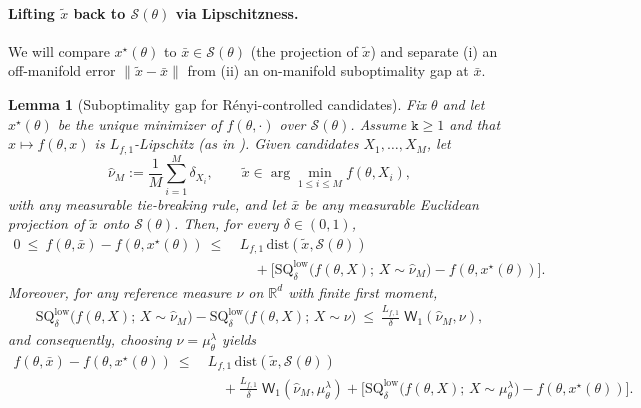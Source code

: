 \documentclass{article}
\theoremstyle{normaltheorem}
\newtheorem{lemma}[lemma]{Lemma}
\newcommand{\gibbs}{\mu}
\newcommand{\dimk}{\texttt{k}}
\newcommand{\R}{\mathbb{R}}
\newcommand{\calS}{\mathcal{S}}
\begin{document}
\paragraph{Lifting $\tilde x$ back to $\calS(\theta)$ via Lipschitzness.}
We will compare $x^\star(\theta)$ to $\bar x\in\calS(\theta)$ (the projection of $\tilde x$) and separate
(i) an off-manifold error $\|\tilde x-\bar x\|$ from (ii) an on-manifold suboptimality gap at $\bar x$.
\begin{lemma}[Suboptimality gap for R\'enyi-controlled candidates]\label{lem:inner-quality-gap}
Fix $\theta$ and let $x^\star(\theta)$ be the unique minimizer of $f(\theta,\cdot)$ over $\calS(\theta)$.
Assume \(\dimk\ge1\) and that $x\mapsto f(\theta,x)$ is $L_{f,1}$-Lipschitz (as in ).
Given candidates \(X_1,\ldots,X_M\), let
\[
\widehat\nu_M:=\frac1M\sum_{i=1}^M\delta_{X_i},
\qquad
\tilde x\in\arg\min_{1\le i\le M}f(\theta,X_i),
\]
with any measurable tie-breaking rule, and let $\bar x$ be any measurable Euclidean projection of \(\tilde x\) onto
\(\calS(\theta)\).
Then, for every \(\delta\in(0,1)\),
\begin{align}
0 \ \le\ f(\theta,\bar x)-f(\theta,x^\star(\theta))
\ \le\ & L_{f,1}\,\mathrm{dist}(\tilde x,\calS(\theta))
\nonumber\\
&\quad + \Big[\mathrm{SQ}^{\mathrm{low}}_\delta\big(f(\theta,X);\,X\sim\widehat\nu_M\big)
	        - f(\theta,x^\star(\theta))\Big].
\label{eq:value-gap-basic}
\end{align}
Moreover, for any reference measure $\nu$ on $\R^d$ with finite first moment,
\begin{align}
\mathrm{SQ}^{\mathrm{low}}_\delta\big(f(\theta,X);\,X\sim\widehat\nu_M\big)
- \mathrm{SQ}^{\mathrm{low}}_\delta\big(f(\theta,X);\,X\sim\nu\big)
\ \le\ \frac{L_{f,1}}{\delta}\;\mathsf{W}_1(\widehat\nu_M,\nu),
\label{eq:sq-w1-lip}
\end{align}
and consequently, choosing $\nu=\gibbs_\theta^\lambda$ yields
\begin{align}
f(\theta,\bar x)-f(\theta,x^\star(\theta))
\ \le\ & L_{f,1}\,\mathrm{dist}(\tilde x,\calS(\theta))
\nonumber\\
&\quad + \frac{L_{f,1}}{\delta}\;\mathsf{W}_1(\widehat\nu_M,\gibbs_\theta^\lambda)
+ \Big[\mathrm{SQ}^{\mathrm{low}}_\delta\big(f(\theta,X);\,X\sim\gibbs_\theta^\lambda\big)
	        - f(\theta,x^\star(\theta))\Big].
\label{eq:value-gap-gibbs}
\end{align}


\end{lemma}
\end{document}
